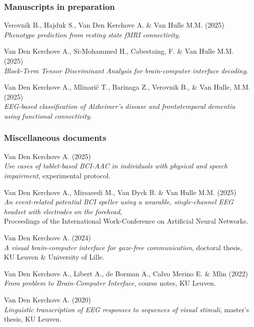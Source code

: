 \documentclass{resume}
\begin{document}
\subsubsection*{Manuscripts in preparation}
\begin{description}
	\item Verovnik B., Hajduk S., Van Den Kerchove A. \& Van Hulle M.M. (2025)\\
	      \emph{Phenotype prediction from resting state fMRI connectivity}.
	\item Van Den Kerchove A., Si-Mohammed H., Cabestaing, F. \& Van Hulle M.M. (2025) \\
	      \emph{Block-Term Tensor Discriminant
		      Analysis for brain-computer interface decoding}.
	\item Van Den Kerchove A., Mlinari\v{c} T., Barinaga Z., Verovnik B., \& Van Hulle, M.M. (2025) \\
	      \emph{EEG-based classification of Alzheimer’s disease and frontotemporal dementia using functional connectivity}.
\end{description}


\subsubsection*{Miscellaneous documents}

\begin{description}
	\item Van Den Kerchove A. (2025) \\
	      \emph{Use cases of tablet-based BCI-AAC in individuals with physical and
		      speech impairment}, experimental protocol.
	\item Van Den Kerchove A., Mirsaeedi M., Van Dyck B. \& Van Hulle M.M. (2025) \\
	      \emph{An event-related potential BCI speller using a wearable, single-channel
		      EEG headset with electrodes on the forehead}, \\
	      Proceedings of the International Work-Conference on Artificial Neural Networks.
	\item Van Den Kerchove A. (2024) \\
	      \emph{A visual brain-computer interface for gaze-free communication},
	      doctoral thesis, KU Leuven \& University of Lille.
	\item Van Den Kerchove A., Libert A., de Borman A., Calvo Merino E. \& Mlin (2022) \\
	      \emph{From problem to Brain-Computer Interface}, course notes, KU Leuven.
	\item Van Den Kerchove A. (2020) \\
	      \emph{Linguistic transcription of EEG responses to sequences of visual stimuli},
	      master's thesis, KU Leuven.

\end{description}
\end{document}
